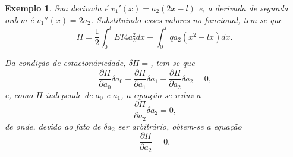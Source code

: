\documentclass[12pt,a4paper]{article}
\newtheorem{example}{Exemplo}
\begin{document}
\begin{example}
	Sua derivada é $v_1'(x)=a_2(2x-l)$ e, a derivada de segunda ordem é $v_1''(x)=2a_2$. Substituindo esses valores no funcional, tem-se que
	$$
		\Pi =
		\frac{1}{2}
		\int_0^l EI 4 a_2 ^2 dx
		-
		\int_0^l q a_2 (x^2-lx) dx
		\text{.}
	$$
	
	Da condição de estacionáriedade, $\delta \Pi=$, tem-se que
	$$
		\frac{\partial \Pi}{\partial a_0} \delta a_0
		+
		\frac{\partial \Pi}{\partial a_1} \delta a_1
		+
		\frac{\partial \Pi}{\partial a_2} \delta a_2
		= 0 \text{,}
	$$
	e, como $\Pi$ independe de $a_0$ e $a_1$, a equação se reduz a
	$$
		\frac{\partial \Pi}{\partial a_2} \delta a_2 
		= 0
		\text{,}
	$$
	de onde, devido ao fato de $\delta a_2$ ser arbitrário, obtem-se a equação
	$$
		\frac{\partial \Pi}{\partial a_2} = 0
		\text{.}
	$$
\end{example}
\end{document}
